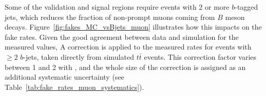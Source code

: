 \begin{table}[t!]
\def\arraystretch{1.15}
\caption{Muon fake rate measured in data and the associated statistical uncertainty. 
The systematic uncertainty originating from the subtraction of ``backgrounds'' with only prompt leptons is also displayed. }
\label{table:fake_rates_muon}
\def\arraystretch{1.15}
\centering
{}



\end{table}

Some of the validation and signal regions require events with 2 or more $b$-tagged jets, 
which reduces the fraction of non-prompt muons coming from $B$ meson decays. 
Figure~\ref{fig:fakes_MC_vsBjets_muon} illustrates how this impacts on the fake rates. 
Given the good agreement between data and simulation for the measured values, 
A correction is applied to the measured rates for events with $\ge 2$ $b$-jets, 
taken directly from simulated $t\bar t$ events. 
This correction factor varies between 1 and 2 with \pt, 
and the whole size of the correction is assigned as an additional systematic uncertainty (see Table~\ref{tab:fake_rates_muon_systematics}). 

